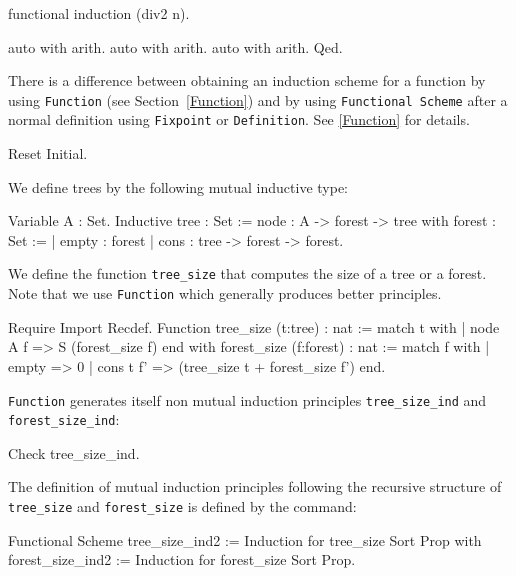 \begin{coq_example}
functional induction (div2 n).
\end{coq_example}

\begin{coq_example*}
auto with arith.
auto with arith.
auto with arith.
Qed.
\end{coq_example*}

\Rem There is a difference between obtaining an induction scheme for a
function by using \texttt{Function} (see Section~\ref{Function}) and by
using \texttt{Functional Scheme} after a normal definition using
\texttt{Fixpoint} or \texttt{Definition}. See \ref{Function} for
details.



\begin{coq_eval}
Reset Initial.
\end{coq_eval}

We define trees by the following mutual inductive type:

\begin{coq_example*}
Variable A : Set.
Inductive tree : Set :=
    node : A -> forest -> tree
with forest : Set :=
  | empty : forest
  | cons : tree -> forest -> forest.
\end{coq_example*}

We define the function \texttt{tree\_size} that computes the size
of a tree or a forest. Note that we use \texttt{Function} which
generally produces better principles.

\begin{coq_example*}
Require Import Recdef.
Function tree_size (t:tree) : nat :=
  match t with
  | node A f => S (forest_size f)
  end
 with forest_size (f:forest) : nat :=
  match f with
  | empty => 0
  | cons t f' => (tree_size t + forest_size f')
  end.
\end{coq_example*}

\Rem \texttt{Function} generates itself non mutual induction
principles {\tt tree\_size\_ind} and {\tt forest\_size\_ind}:

\begin{coq_example}
Check tree_size_ind.
\end{coq_example}

The definition of mutual induction principles following the recursive
structure of \texttt{tree\_size} and \texttt{forest\_size} is defined
by the command:

\begin{coq_example*}
Functional Scheme tree_size_ind2 := Induction for tree_size Sort Prop
with forest_size_ind2 := Induction for forest_size Sort Prop.
\end{coq_example*}

